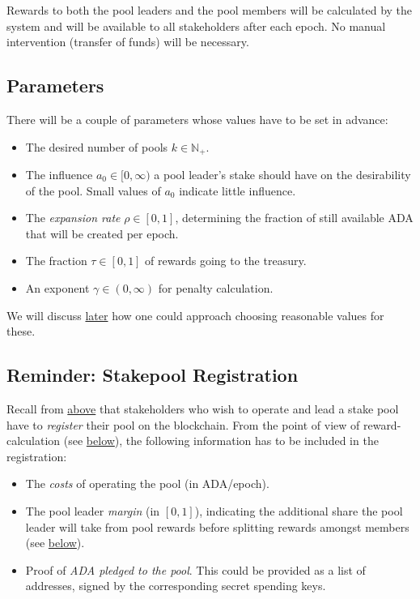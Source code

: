 \documentclass[11pt,a4paper]{article}
\begin{document}
Rewards to both the pool leaders and the pool members will be calculated
by the system and will be available to all stakeholders after each
epoch. No manual intervention (transfer of funds) will be necessary.

\subsection{Parameters}
\label{parameters}

There will be a couple of parameters whose values have to be set in
advance:

\begin{itemize}
\item
  The desired number of pools \(k\in\mathbb{N}_+\).
\item
  The influence \(a_0\in[0,\infty)\) a pool leader's stake should have
  on the desirability of the pool. Small values of \(a_0\) indicate
  little influence.
\item
  The \emph{expansion rate} \(\rho\in[0,1]\), determining the fraction
  of still available ADA that will be created per epoch.
\item
  The fraction \(\tau\in[0,1]\) of rewards going to the treasury.
\item
  An exponent \(\gamma\in(0,\infty)\) for penalty calculation.
\end{itemize}

We will discuss
\hyperref[deciding-on-good-values-for-the-parameters]{later} how one
could approach choosing reasonable values for these.

\subsection{Reminder: Stakepool Registration}
\label{reminder-stakepool-registration}

Recall from \hyperref[stakepool-registration]{above} that stakeholders
who wish to operate and lead a stake pool have to \emph{register} their
pool on the blockchain. From the point of view of reward-calculation
(see \hyperref[epoch-rewards]{below}), the following information has to
be included in the registration:

\begin{itemize}
\item
  The \emph{costs} of operating the pool (in ADA/epoch).
\item
  The pool leader \emph{margin} (in \([0,1]\)), indicating the
  additional share the pool leader will take from pool rewards before
  splitting rewards amongst members (see
  \hyperref[pool-leader-reward]{below}).
\item
  Proof of \emph{ADA pledged to the pool}. This could be provided as a
  list of addresses, signed by the corresponding secret spending keys.
\end{itemize}
\end{document}

